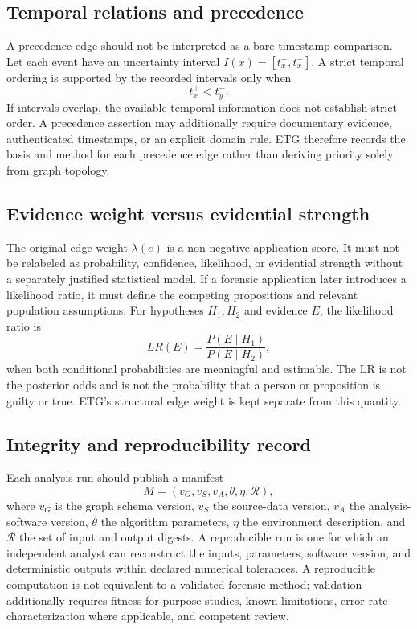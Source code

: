 \documentclass[11pt]{article}
\begin{document}
\subsection{Temporal relations and precedence}
A precedence edge should not be interpreted as a bare timestamp comparison. Let each event have an uncertainty interval $I(x)=[t_x^-,t_x^+]$. A strict temporal ordering is supported by the recorded intervals only when
\[
t_x^+ < t_y^-.
\]
If intervals overlap, the available temporal information does not establish strict order. A precedence assertion may additionally require documentary evidence, authenticated timestamps, or an explicit domain rule. ETG therefore records the basis and method for each precedence edge rather than deriving priority solely from graph topology.
\subsection{Evidence weight versus evidential strength}
The original edge weight $\lambda(e)$ is a non-negative application score. It must not be relabeled as probability, confidence, likelihood, or evidential strength without a separately justified statistical model. If a forensic application later introduces a likelihood ratio, it must define the competing propositions and relevant population assumptions. For hypotheses $H_1,H_2$ and evidence $E$, the likelihood ratio is
\[
LR(E)=\frac{P(E\mid H_1)}{P(E\mid H_2)},
\]
when both conditional probabilities are meaningful and estimable. The LR is not the posterior odds and is not the probability that a person or proposition is guilty or true. ETG's structural edge weight is kept separate from this quantity.
\subsection{Integrity and reproducibility record}
Each analysis run should publish a manifest
\[
M=(v_G,v_S,v_A,\theta,\eta,\mathcal{R}),
\]
where $v_G$ is the graph schema version, $v_S$ the source-data version, $v_A$ the analysis-software version, $\theta$ the algorithm parameters, $\eta$ the environment description, and $\mathcal{R}$ the set of input and output digests. A reproducible run is one for which an independent analyst can reconstruct the inputs, parameters, software version, and deterministic outputs within declared numerical tolerances. A reproducible computation is not equivalent to a validated forensic method; validation additionally requires fitness-for-purpose studies, known limitations, error-rate characterization where applicable, and competent review.
\end{document}
